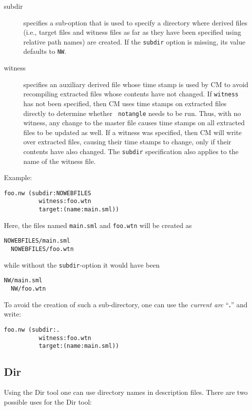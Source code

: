 \begin{description}
\item[subdir] specifies a sub-option that is used to specify a
directory where derived files (i.e., target files and witness files as
far as they have been specified using relative path names) are
created.  If the {\tt subdir} option is missing, its value defaults to
{\tt NW}.
\item[witness] specifies an auxiliary derived file whose time stamp is
used by CM to avoid recompiling extracted files whose contents have
not changed.  If {\tt witness} has not been specified, then CM uses
time stamps on extracted files directly to determine whether {\tt
notangle} needs to be run.  Thus, with no witness, any change to the
master file causes time stamps on all extracted files to be updated as
well.  If a witness was specified, then CM will write over extracted
files, causing their time stamps to change, only if their contents
have also changed.  The {\tt subdir} specification also applies to the
name of the witness file.
\end{description}

Example:

\begin{lstlisting}[language=CM]
  foo.nw (subdir:NOWEBFILES
          witness:foo.wtn
          target:(name:main.sml))
\end{lstlisting}%

Here, the files named {\tt main.sml} and {\tt foo.wtn} will be
created as
\begin{lstlisting}[language=CM]
  NOWEBFILES/main.sml
  NOWEBFILES/foo.wtn
\end{lstlisting}%
\noindent while without the {\tt subdir}-option it would have been
\begin{lstlisting}[language=CM]
  NW/main.sml
  NW/foo.wtn
\end{lstlisting}%
\noindent To avoid the creation of such a sub-directory, one can use
the {\em current arc} ``{\bf .}'' and write:
\begin{lstlisting}[language=CM]
  foo.nw (subdir:.
          witness:foo.wtn
          target:(name:main.sml))
\end{lstlisting}%

\subsection{Dir}
\label{sec:builtin-tools:dir}

Using the Dir tool one can use directory names in description files.
There are two possible uses for the Dir tool:


